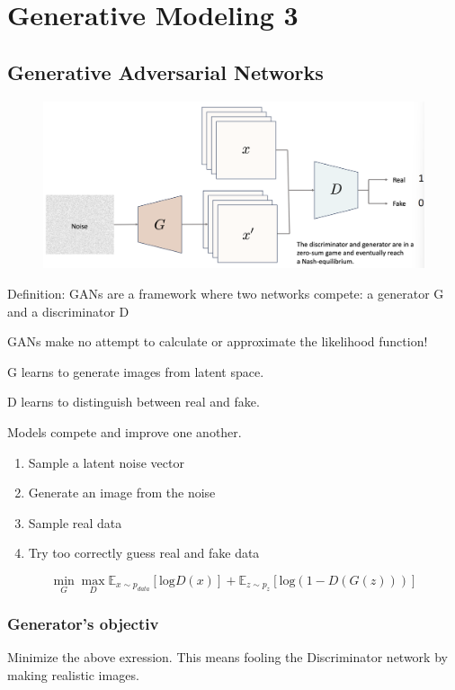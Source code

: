 \section{Generative Modeling 3}
\subsection{Generative Adversarial Networks}
\begin{figure}[!h]
    \includegraphics[width = \columnwidth]{figures/GenAI3/GAN.png}
\end{figure}
Definition: GANs are a framework where two networks compete: a generator G and a discriminator D 

GANs make no attempt to calculate or approximate the likelihood function!

G learns to generate images from latent space.

D learns to distinguish between real and fake.

Models compete and improve one another.

\begin{enumerate}
    \item Sample a latent noise vector
    \item Generate an image from the noise
    \item Sample real data
    \item Try too correctly guess real and fake data
\end{enumerate}
\[
\min_G \max_D \mathbb{E}_{x\sim p_{data}}\left[\text{log}D(x)\right] + \mathbb{E}_{z\sim p_{z}}\left[\text{log}(1-D(G(z)))\right]
\]

\subsubsection*{Generator's objectiv}
Minimize the above exression.
This means fooling the Discriminator network by making realistic images.


